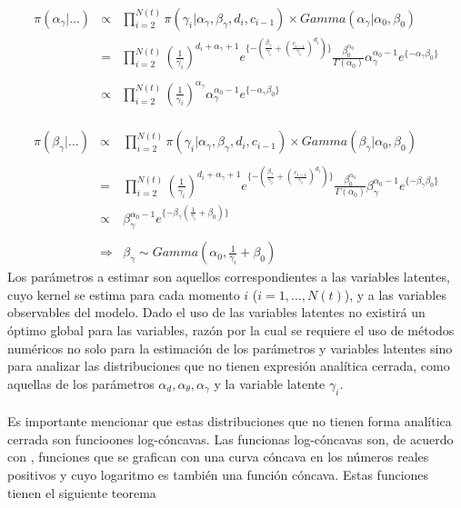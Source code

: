 \\
\begin{eqnarray*}
\pi(\alpha_\gamma|...)&\propto&\prod_{i=2}^{N(t)} \pi(\gamma_i|\alpha_\gamma,\beta_\gamma,d_i,c_{i-1})\times Gamma(\alpha_\gamma|\alpha_0,\beta_0)\\
&=&\prod_{i=2}^{N(t)}(\frac{1}{\gamma_i})^{d_i+\alpha_\gamma+1}e^{\{-(\frac{\beta_\gamma}{\gamma_i}+(\frac{c_{i-1}}{\gamma_i})^{d_i})\}}\frac{\beta_0^{\alpha_0}}{\Gamma(\alpha_0)} \alpha_\gamma^{\alpha_0-1}e^{\{-\alpha_\gamma\beta_0\}}\\
\\
&\propto&\prod_{i=2}^{N(t)} (\frac{1}{\gamma_i})^{\alpha_\gamma}\alpha_\gamma^{\alpha_0-1}e^{\{-\alpha_\gamma\beta_0\}}
\end{eqnarray*}
\\
\begin{eqnarray*}
\pi(\beta_\gamma|...)&\propto&\prod_{i=2}^{N(t)} \pi(\gamma_i|\alpha_\gamma,\beta_\gamma,d_i,c_{i-1})\times Gamma(\beta_\gamma|\alpha_0,\beta_0)\\
\\
&=&\prod_{i=2}^{N(t)}(\frac{1}{\gamma_i})^{d_i+\alpha_\gamma+1}e^{\{-(\frac{\beta_\gamma}{\gamma_i}+(\frac{c_{i-1}}{\gamma_i})^{d_i})\}}\frac{\beta_0^{\alpha_0}}{\Gamma(\alpha_0)} \beta_\gamma^{\alpha_0-1}e^{\{-\beta_\gamma\beta_0\}}\\
&\propto&\beta_\gamma^{\alpha_0-1}e^{\{-\beta_\gamma(\frac{1}{\gamma_i}+\beta_0)\}}\\
\\
&\Rightarrow& \beta_\gamma \sim Gamma(\alpha_0,\frac{1}{\gamma_i}+\beta_0)
\end{eqnarray*}
Los par\'ametros a estimar son aquellos correspondientes a las variables latentes, cuyo kernel se estima para cada momento $i$ ($i=1,...,N(t)$), y a las variables observables del modelo. Dado el uso de las variables latentes no existir\'a un \'optimo global para las variables, raz\'on por la cual se requiere el uso de m\'etodos num\'ericos no solo para la estimaci\'on de los par\'ametros y variables latentes sino para analizar las distribuciones que no tienen expresi\'on anal\'itica cerrada, como aquellas de los par\'ametros $\alpha_d,\alpha_\theta,\alpha_\gamma$ y la variable latente $\gamma_i$.\\
\\
Es importante mencionar que estas distribuciones que no tienen forma anal\'itica cerrada son funcioones log-c\'oncavas. Las funcionas log-c\'oncavas son, de acuerdo con \cite{bagnoli2005log}, funciones que se grafican con una curva c\'oncava en los n\'umeros reales positivos y cuyo logaritmo es tambi\'en una funci\'on c\'oncava. Estas funciones tienen el siguiente teorema\\
